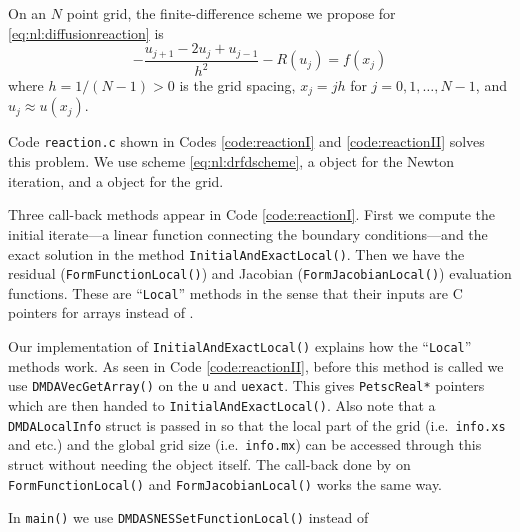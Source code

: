On an $N$ point grid, the finite-difference scheme we propose for \eqref{eq:nl:diffusionreaction} is
\begin{equation}
- \frac{u_{j+1} - 2 u_j + u_{j-1}}{h^2} - R(u_j) = f(x_j)   \label{eq:nl:drfdscheme}
\end{equation}
where $h=1/(N-1)>0$ is the grid spacing, $x_j = j h$ for $j=0,1,\dots,N-1$, and $u_j \approx u(x_j)$.

Code \texttt{reaction.c} shown in Codes \ref{code:reactionI} and \ref{code:reactionII} solves this problem.  We use scheme \eqref{eq:nl:drfdscheme}, a \pSNES object for the Newton iteration, and a \pDMDA object for the grid.

Three call-back methods appear in Code \ref{code:reactionI}.  First we compute the initial iterate---a linear function connecting the boundary conditions---and the exact solution in the method \texttt{InitialAndExactLocal()}.  Then we have the residual (\texttt{FormFunctionLocal()}) and Jacobian (\texttt{FormJacobianLocal()}) evaluation functions.  These are ``\texttt{Local}'' methods in the sense that their inputs are C pointers for arrays instead of \pVecs.



Our implementation of \texttt{InitialAndExactLocal()} explains how the ``\texttt{Local}'' methods work.  As seen in Code \ref{code:reactionII}, before this method is called we use \texttt{DMDAVecGetArray()} on the \pVecs \texttt{u} and \texttt{uexact}.  This gives \texttt{PetscReal*} pointers which are then handed to \texttt{InitialAndExactLocal()}.  Also note that a \texttt{DMDALocalInfo} struct is passed in so that the local part of the grid (i.e.~\texttt{info.xs} and etc.) and the global grid size (i.e.~\texttt{info.mx}) can be accessed through this struct without needing the \pDMDA object itself.  The call-back done by \pSNES on \texttt{FormFunctionLocal()} and \texttt{FormJacobianLocal()} works the same way.

In \texttt{main()} we use \texttt{DMDASNESSetFunctionLocal()} instead of

